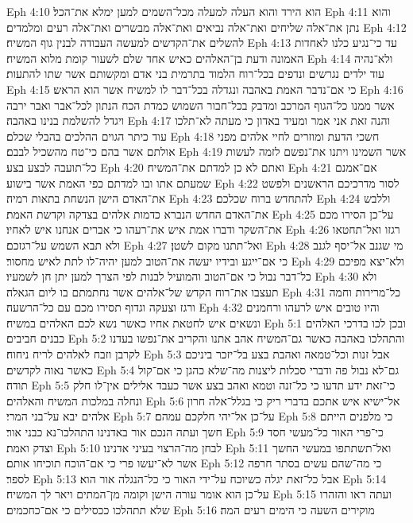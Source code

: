 Eph 4:10  הוא הירד והוא העלה למעלה מכל־השמים למען ימלא את־הכל׃
Eph 4:11  והוא נתן את־אלה שליחים ואת־אלה נביאים ואת־אלה מבשרים ואת־אלה רעים ומלמדים׃
Eph 4:12  להשלים את־הקדשים למעשה העבודה לבנין גוף המשיח׃
Eph 4:13  עד כי־נגיע כלנו לאחדות האמונה ודעת בן־האלהים כאיש אחד שלם לשעור קומת מלוא המשיח׃
Eph 4:14  ולא־נהיה עוד ילדים נגרשים ונדפים בכל־רוח הלמוד בתרמית בני אדם ומקשותם אשר שתו להתעות׃
Eph 4:15  כי אם־נדבר האמת באהבה ונגדלה בכל־דבר לו למשיח אשר הוא הראש׃
Eph 4:16  אשר ממנו כל־הגוף המרכב ומדבק בכל־חבור השמוש כמדת הכח הנתון לכל־אבר ואבר ירבה ויגדל להשלמת בנינו באהבה׃
Eph 4:17  והנה זאת אני אמר ומעיד באדון כי מעתה לא־תלכו עוד כיתר הגוים ההלכים בהבלי שכלם׃
Eph 4:18  חשכי הדעת ומוזרים לחיי אלהים מפני אולתם אשר בהם כי־טח מהשכיל לבבם׃
Eph 4:19  אשר השמינו ויתנו את־נפשם לזמה לעשות כל־תועבה לבצע בצע׃
Eph 4:20  ואתם לא כן למדתם את־המשיח׃
Eph 4:21  אם־אמנם שמעתם אתו ובו למדתם כפי האמת אשר בישוע׃
Eph 4:22  לסור מדרכיכם הראשנים ולפשט את־האדם הישן הנשחת בתאות רמיה׃
Eph 4:23  להתחדש ברוח שכלכם׃
Eph 4:24  וללבש את־האדם החדש הנברא כדמות אלהים בצדקה וקדשת האמת׃
Eph 4:25  על־כן הסירו מכם את־השקר ודברו אמת איש את־רעהו כי אברים אנחנו איש לאחיו׃
Eph 4:26  רגזו ואל־תחטאו ולא תבא השמש על־רגזכם׃
Eph 4:27  ואל־תתנו מקום לשטן׃
Eph 4:28  מי שגנב אל־יסף לגנב כי אם־ייגע ובידיו יעשה את־הטוב למען יהיה־לו לתת לאיש מחסור׃
Eph 4:29  ולא־יצא מפיכם כל־דבר נבול כי אם־הטוב והמועיל לבנות לפי הצרך למען יתן חן לשמעיו׃
Eph 4:30  ולא תעצבו את־רוח הקדש של־אלהים אשר נחתמתם בו ליום הגאלה׃
Eph 4:31  כל־מרירות וחמה ורגז וצעקה וגדוף תסירו מכם עם כל־הרשעה׃
Eph 4:32  והיו טובים איש לרעהו ורחמנים ונשאים איש לחטאת אחיו כאשר נשא לכם האלהים במשיח׃
Eph 5:1  ובכן לכו בדרכי האלהים כבנים חביבים׃
Eph 5:2  והתהלכו באהבה כאשר גם־המשיח אהב אתנו והקריב את־נפשו בעדנו לקרבן וזבח לאלהים לריח ניחוח׃
Eph 5:3  אבל זנות וכל־טמאה ואהבת בצע בל־יזכר ביניכם כאשר נאוה לקדשים׃
Eph 5:4  גם־לא נבול פה ודברי סכלות ליצנות מה־שלא כהגן כי אם־קול תודה׃
Eph 5:5  כי־זאת ידע תדעו כי כל־זנה וטמא ואהב בצע אשר כעבד אלילים אין־לו חלק ונחלה במלכות המשיח והאלהים׃
Eph 5:6  אל־ישיא איש אתכם בדברי ריק כי בגלל־אלה חרון אלהים יבא על־בני המרי׃
Eph 5:7  על־כן אל־יהי חלקכם עמהם׃
Eph 5:8  כי מלפנים הייתם חשך ועתה הנכם אור באדנינו התהלכו־נא כבני אור׃
Eph 5:9  כי־פרי האור כל־מעשי חסד וצדק ואמת׃
Eph 5:10  לבחן מה־הרצוי בעיני אדנינו׃
Eph 5:11  ואל־תשתתפו במעשי החשך אשר לא־יעשו פרי כי אם־הוכח תוכיחו אותם׃
Eph 5:12  כי מה־שהם עשים בסתר חרפה לספר׃
Eph 5:13  אבל כל־זאת יגלה כשיוכח על־ידי האור כי כל־הנגלה אור הוא׃
Eph 5:14  על־כן הוא אומר עורה הישן וקומה מן־המתים ויאר לך המשיח׃
Eph 5:15  ועתה ראו והזהרו שלא תתהלכו ככסילים כי אם־כחכמים׃
Eph 5:16  מוקירים השעה כי הימים רעים המה׃
